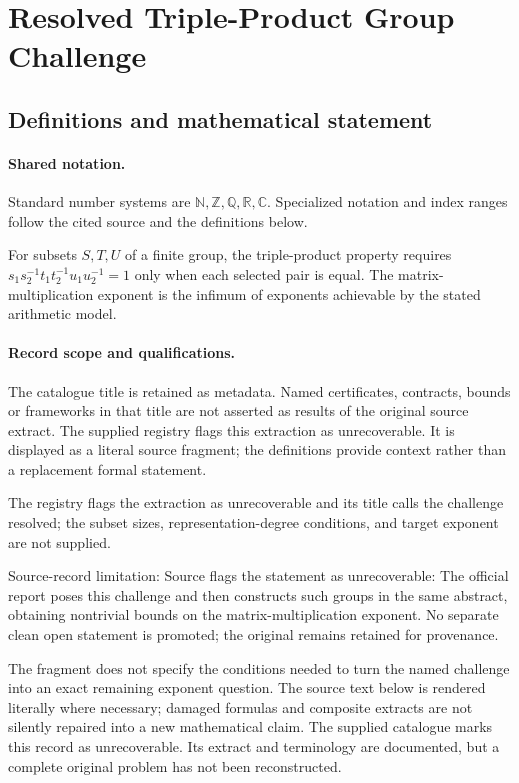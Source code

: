 \documentclass[11pt]{article}
\begin{document}
\section{Resolved Triple-Product Group Challenge}\label{statement}

\subsection{Definitions and mathematical statement}

\paragraph{Shared notation.}Standard number systems are $\mathbb N,\mathbb Z,\mathbb Q,\mathbb R,\mathbb C$. Specialized notation and index ranges follow the cited source and the definitions below.


For subsets $S,T,U$ of a finite group, the triple-product property requires $s_1s_2^{-1}t_1t_2^{-1}u_1u_2^{-1}=1$ only when each selected pair is equal. The matrix-multiplication exponent is the infimum of exponents achievable by the stated arithmetic model.
\paragraph{Record scope and qualifications.}
The catalogue title is retained as metadata. Named certificates, contracts, bounds or frameworks in that title are not asserted as results of the original source extract.
The supplied registry flags this extraction as unrecoverable. It is displayed as a literal source fragment; the definitions provide context rather than a replacement formal statement.

The registry flags the extraction as unrecoverable and its title calls the challenge resolved; the subset sizes, representation-degree conditions, and target exponent are not supplied.

Source-record limitation: Source flags the statement as unrecoverable: The official report poses this challenge and then constructs such groups in the same abstract, obtaining nontrivial bounds on the matrix-multiplication exponent. No separate clean open statement is promoted; the original remains retained for provenance.

The fragment does not specify the conditions needed to turn the named challenge into an exact remaining exponent question.
The source text below is rendered literally where necessary; damaged formulas and composite extracts are not silently repaired into a new mathematical claim.
The supplied catalogue marks this record as unrecoverable. Its extract and terminology are documented, but a complete original problem has not been reconstructed.
\end{document}
